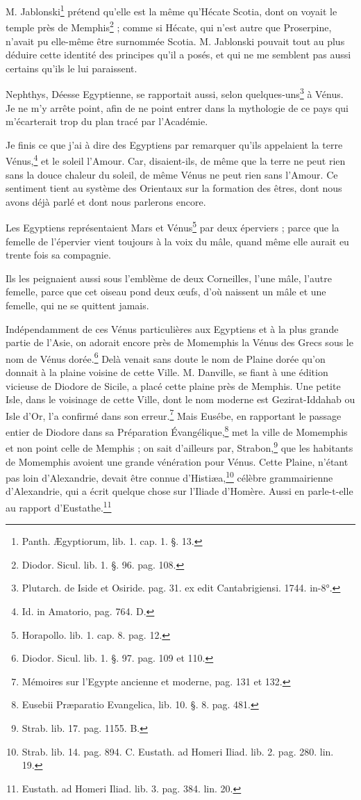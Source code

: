 \documentclass[a4paper, 18pt, oneside]{article}
\begin{document}
M. Jablonski\footnote{Panth. Ægyptiorum, lib. 1. cap. 1. §. 13.} prétend qu'elle est la même qu'Hécate Scotia, dont on voyait le temple près de Memphis\footnote{Diodor. Sicul. lib. 1. §. 96. pag. 108.} ; comme si Hécate, qui n'est autre que Proserpine, n'avait pu elle-même être surnommée Scotia. M. Jablonski pouvait tout au plus déduire cette identité des principes qu'il a posés, et qui ne me semblent pas aussi certains qu'ils le lui paraissent.

Nephthys, Déesse Egyptienne, se rapportait aussi, selon quelques-uns\footnote{Plutarch. de Iside et Osiride. pag. 31. ex edit Cantabrigiensi. 1744. in-8°.} à Vénus. Je ne m'y arrête point, afin de ne point entrer dans la mythologie de ce pays qui m'écarterait trop du plan tracé par l'Académie.

Je finis ce que j'ai à dire des Egyptiens par remarquer qu'ils appelaient la terre Vénus,\footnote{Id. in Amatorio, pag. 764. D.} et le soleil l'Amour. Car, disaient-ils, de même que la terre ne peut rien sans la douce chaleur du soleil, de même Vénus ne peut rien sans l'Amour. Ce sentiment tient au système des Orientaux sur la formation des êtres, dont nous avons déjà parlé et dont nous parlerons encore.

Les Egyptiens représentaient Mars et Vénus\footnote{Horapollo. lib. 1. cap. 8. pag. 12.} par deux éperviers ; parce que la femelle de l'épervier vient toujours à la voix du mâle, quand même elle aurait eu trente fois sa compagnie.

Ils les peignaient aussi sous l'emblème de deux Corneilles, l'une mâle, l'autre femelle, parce que cet oiseau pond deux œufs, d'où naissent un mâle et une femelle, qui ne se quittent jamais.

Indépendamment de ces Vénus particulières aux Egyptiens et à la plus grande partie de l'Asie, on adorait encore près de Momemphis la Vénus des Grecs sous le nom de Vénus dorée.\footnote{Diodor. Sicul. lib. 1. §. 97. pag. 109 et 110.} Delà venait sans doute le nom de Plaine dorée qu'on donnait à la plaine voisine de cette Ville. M. Danville, se fiant à une édition vicieuse de Diodore de Sicile, a placé cette plaine près de Memphis. Une petite Isle, dans le voisinage de cette Ville, dont le nom moderne est Gezirat-Iddahab ou Isle d'Or, l'a confirmé dans son erreur.\footnote{Mémoires sur l'Egypte ancienne et moderne, pag. 131 et 132.} Mais Eusébe, en rapportant le passage entier de Diodore dans sa Préparation Évangélique,\footnote{Eusebii Præparatio Evangelica, lib. 10. §. 8. pag. 481.} met la ville de Momemphis et non point celle de Memphis ; on sait d'ailleurs par, Strabon,\footnote{Strab. lib. 17. pag. 1155. B.} que les habitants de Momemphis avoient une grande vénération pour Vénus. Cette Plaine, n'étant pas loin d'Alexandrie, devait être connue d'Histiæa,\footnote{Strab. lib. 14. pag. 894. C. Eustath. ad Homeri Iliad. lib. 2. pag. 280. lin. 19.} célèbre grammairienne d'Alexandrie, qui a écrit quelque chose sur l'Iliade d'Homère. Aussi en parle-t-elle au rapport d'Eustathe.\footnote{Eustath. ad Homeri Iliad. lib. 3. pag. 384. lin. 20.}
\end{document}
